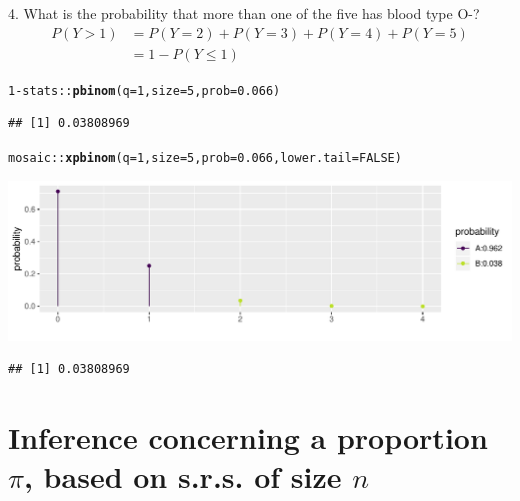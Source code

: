 \documentclass{beamer}\usepackage[]{graphicx}\usepackage[]{color}
\newcommand{\hlnum}[1]{\textcolor[rgb]{0.686,0.059,0.569}{#1}}%
\newcommand{\hlopt}[1]{\textcolor[rgb]{0,0,0}{#1}}%
\newcommand{\hlstd}[1]{\textcolor[rgb]{0.345,0.345,0.345}{#1}}%
\newcommand{\hlkwc}[1]{\textcolor[rgb]{0.333,0.667,0.333}{#1}}%
\newcommand{\hlkwd}[1]{\textcolor[rgb]{0.737,0.353,0.396}{\textbf{#1}}}%
\newenvironment{knitrout}{}{} %
\begin{document}
\begin{frame}[fragile]{4. What is the probability that more than one of the five has blood type O-?}
\footnotesize
\begin{align*}
P(Y > 1) & = P(Y = 2) + P(Y = 3) + P(Y=4) + P(Y=5) \\
& = 1 - P(Y \leq 1)
\end{align*}


\begin{knitrout}\scriptsize
{}\color{fgcolor}
\begin{alltt}
\hlnum{1} \hlopt{-} \hlstd{stats}\hlopt{::}\hlkwd{pbinom}\hlstd{(}\hlkwc{q} \hlstd{=} \hlnum{1}\hlstd{,} \hlkwc{size} \hlstd{=} \hlnum{5}\hlstd{,} \hlkwc{prob} \hlstd{=} \hlnum{0.066}\hlstd{)}
\end{alltt}
\begin{verbatim}
## [1] 0.03808969
\end{verbatim}
\begin{alltt}
\hlstd{mosaic}\hlopt{::}\hlkwd{xpbinom}\hlstd{(}\hlkwc{q} \hlstd{=} \hlnum{1}\hlstd{,} \hlkwc{size} \hlstd{=} \hlnum{5}\hlstd{,} \hlkwc{prob} \hlstd{=} \hlnum{0.066}\hlstd{,} \hlkwc{lower.tail} \hlstd{=} \hlnum{FALSE}\hlstd{)}
\end{alltt}


{\centering \includegraphics[width=1\linewidth]{figure/unnamed-chunk-11-1} 

}


\begin{verbatim}
## [1] 0.03808969
\end{verbatim}

\end{knitrout}

\end{frame}



\section{Inference concerning a proportion $\pi$, based on s.r.s. of size $n$}
\end{document}
